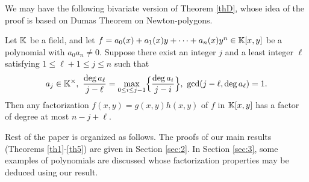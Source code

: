 \documentclass[12pt,reqno]{amsart}%
\begin{document}
We may have the following bivariate version of Theorem \ref{thD}, whose idea of the proof is based on Dumas Theorem \cite{Du} on Newton-polygons.
\begin{theorem}\label{th5} Let $\mathbb{K}$ be a field, and let
         $f=a_0(x)+ a_{1}(x)y+\cdots+a_n(x) y^n\in \mathbb{K}[x,y]$ be a polynomial with $a_0a_n\neq 0$. Suppose there exist an integer $j$ and a least integer $\ell$ satisfying $1\leq \ell+1\leq j\leq n$ such that
         \begin{eqnarray*}
         a_j\in \mathbb{K}^\times,~\frac{\deg a_\ell}{j-\ell}=\max_{0\leq i\leq j-1}\Bigl\{\frac{\deg a_i}{j-i}\Bigr\},~\gcd(j-\ell,\deg a_\ell)=1.
         \end{eqnarray*}
    Then any factorization $f(x,y)=g(x,y)h(x,y)$ of $f$ in $\mathbb{K}[x,y]$ has a factor of degree at most $n-j+\ell$.
\end{theorem}
Rest of the paper is organized as follows. The proofs of our main results (Theorems \ref{th1}-\ref{th5}) are given in Section \ref{sec:2}. In Section \ref{sec:3}, some examples of polynomials are discussed whose factorization properties may be deduced using our result.
\end{document}
